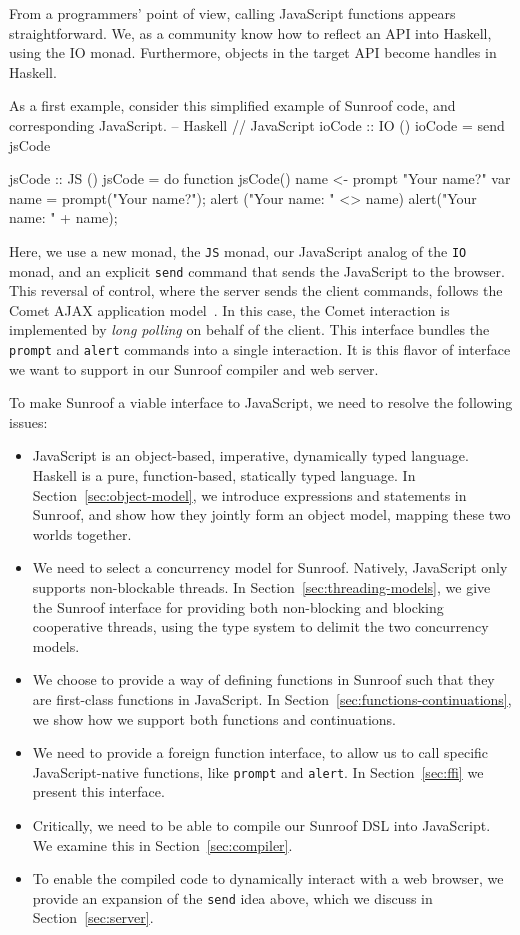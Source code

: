 \documentclass{llncs}
\newcommand{\Src}[1]{{\tt{#1}}}
\newenvironment{Code}{\verbatim}{\endverbatim}
\begin{document}
From a programmers' point of view, calling JavaScript functions
appears straightforward. We, as a community know how to reflect an
API into Haskell, using the IO monad. Furthermore, objects in
the target API become handles in Haskell. 

As a first example, consider this simplified example of Sunroof code, and corresponding JavaScript.
\noindent
\begin{Code}
-- Haskell                          // JavaScript
ioCode :: IO ()
ioCode = send jsCode

jsCode :: JS ()
jsCode = do                        function jsCode() {
   name <- prompt "Your name?"       var name = prompt("Your name?"); 
   alert ("Your name: " <> name)     alert("Your name: " + name); 
                                   }
\end{Code}%

Here, we use a new monad, the \Src{JS} monad, our JavaScript
analog of the \Src{IO} monad,
and an explicit \Src{send} command that sends the JavaScript to the browser.
This reversal of control, where the
server sends the client commands, follows the Comet AJAX application model~\cite{..}.
In this case, the Comet interaction is implemented by {\em long polling\/} on behalf of the client.
This interface bundles the \Src{prompt} and \Src{alert} commands
into a single interaction.
It is this flavor of interface we want to support in our Sunroof compiler
and web server.  

To make Sunroof a viable interface to JavaScript, we need to
resolve the following issues:
\begin{itemize}
\item JavaScript is an object-based, imperative, dynamically typed language.
Haskell is a pure, function-based, statically typed language.
In Section~\ref{sec:object-model}, we introduce expressions and statements
in Sunroof, and show how they jointly form an object model,
mapping these two worlds together.
%
\item We need to select a concurrency model for Sunroof.
Natively, JavaScript only supports non-blockable threads.
In Section~\ref{sec:threading-models}, we give the
Sunroof interface for providing both non-blocking and blocking cooperative threads,
using the type system to delimit the two concurrency models.
%
\item We choose to provide a way of defining functions
in Sunroof such that they are first-class functions
in JavaScript. In Section~\ref{sec:functions-continuations},
we show how we support both functions and continuations.
%
\item We need to provide a foreign function interface,
to allow us to call specific JavaScript-native functions,
like \Src{prompt} and \Src{alert}.
In Section~\ref{sec:ffi} we present this interface.
%
\item Critically, we need to be able to compile our Sunroof DSL
into JavaScript. We examine this in Section~\ref{sec:compiler}.
\item To enable the compiled code to dynamically interact with
a web browser, we provide an expansion of the \Src{send} idea above,
which we discuss in Section~\ref{sec:server}.
\end{itemize}
\end{document}
